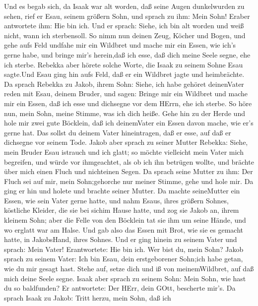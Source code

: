 Und es begab sich, da Isaak war alt worden, daß seine Augen
dunkelwurden zu sehen, rief er Esau, seinem größern Sohn, und sprach zu
ihm: Mein Sohn! Eraber antwortete ihm: Hie bin ich.  Und er
sprach: Siehe, ich bin alt worden und weiß nicht, wann ich sterbensoll.
 So nimm nun deinen Zeug, Köcher und Bogen, und gehe aufs
Feld undfahe mir ein Wildbret  und mache mir ein Essen, wie
ich's gerne habe, und bringe mir's herein,daß ich esse, daß dich meine
Seele segne, ehe ich sterbe.  Rebekka aber hörete solche
Worte, die Isaak zu seinem Sohne Esau sagte.Und Esau ging hin aufs Feld,
daß er ein Wildbret jagte und heimbrächte.  Da sprach
Rebekka zu Jakob, ihrem Sohn: Siehe, ich habe gehöret deinenVater reden
mit Esau, deinem Bruder, und sagen:  Bringe mir ein Wildbret
und mache mir ein Essen, daß ich esse und dichsegne vor dem HErrn, ehe
ich sterbe.  So höre nun, mein Sohn, meine Stimme, was ich
dich heiße.  Gehe hin zu der Herde und hole mir zwei gute
Böcklein, daß ich deinemVater ein Essen davon mache, wie er's gerne hat.
 Das sollst du deinem Vater hineintragen, daß er esse, auf
daß er dichsegne vor seinem Tode.  Jakob aber sprach zu
seiner Mutter Rebekka: Siehe, mein Bruder Esau istrauch und ich glatt;
 so möchte vielleicht mein Vater mich begreifen, und würde
vor ihmgeachtet, als ob ich ihn betrügen wollte, und brächte über mich
einen Fluch und nichteinen Segen.  Da sprach seine Mutter
zu ihm: Der Fluch sei auf mir, mein Sohn;gehorche nur meiner Stimme,
gehe und hole mir.  Da ging er hin und holete und brachte
seiner Mutter. Da machte seineMutter ein Essen, wie sein Vater gerne
hatte,  und nahm Esaus, ihres größern Sohnes, köstliche
Kleider, die sie bei sichim Hause hatte, und zog sie Jakob an, ihrem
kleinem Sohn;  aber die Felle von den Böcklein tat sie ihm
um seine Hände, und wo erglatt war am Halse.  Und gab also
das Essen mit Brot, wie sie es gemacht hatte, in JakobsHand, ihres
Sohnes.  Und er ging hinein zu seinem Vater und sprach:
Mein Vater! Erantwortete: Hie bin ich. Wer bist du, mein Sohn?
 Jakob sprach zu seinem Vater: Ich bin Esau, dein
erstgeborener Sohn;ich habe getan, wie du mir gesagt hast. Stehe auf,
setze dich und iß von meinemWildbret, auf daß mich deine Seele segne.
 Isaak aber sprach zu seinem Sohn: Mein Sohn, wie hast du
so baldfunden? Er antwortete: Der HErr, dein GOtt, bescherte mir's.
 Da sprach Isaak zu Jakob: Tritt herzu, mein Sohn, daß ich
